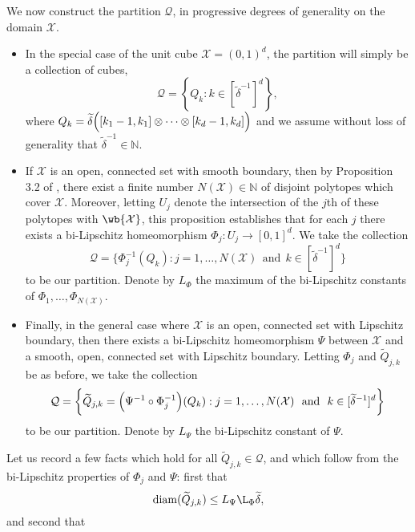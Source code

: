 \documentclass[twoside]{article}
\newcommand{\set}[1]{\left\{#1\right\}}
\newcommand{\diam}{\mathrm{diam}}
\newcommand{\1}{\mathbf{1}}
\newcommand{\Xset}{\mathcal{X}}
\newcommand{\mc}[1]{\mathcal{#1}}
\newcommand{\wt}[1]{\widetilde{#1}}
\theoremstyle{definition}
\theoremstyle{remark}
\begin{document}
We now construct the partition $\mc{Q}$, in progressive degrees of generality on the domain $\Xset.$
\begin{itemize}
	\item In the special case of the unit cube $\Xset = (0,1)^d$, the partition will simply be a collection of cubes,
	\begin{equation*}
	\mc{Q} = \set{Q_k: k \in [\wt{\delta}^{-1}]^d},
	\end{equation*}
	where $Q_k = \wt{\delta}\Bigl([k_1 - 1,k_1] \otimes \cdots \otimes [k_d - 1,k_d]\Bigr)$ and we assume without loss of generality that $\wt{\delta}^{-1} \in \mathbb{N}$.
	\item If $\mc{\Xset}$ is an open, connected set with smooth boundary, then by Proposition 3.2 of \citet{trillos2015}, there exist a finite number $N(\Xset) \in \mathbb{N}$ of disjoint polytopes which cover $\Xset$. Moreover, letting $U_j$ denote the intersection of the $j$th of these polytopes with $\wb{\Xset}$, this proposition establishes that for each $j$ there exists a bi-Lipschitz homeomorphism $\Phi_j: U_j \to [0,1]^d$. We take the collection
	\begin{equation*}
	\mc{Q} = \biggl\{\Phi_j^{-1}(Q_k): j = 1,\ldots,N(\Xset)~~\textrm{and}~~k \in [\wt{\delta}^{-1}]^d\biggr\}
	\end{equation*}
	to be our partition. Denote by $L_{\Phi}$ the maximum of the bi-Lipschitz constants of $\Phi_1,\ldots,\Phi_{N(\Xset)}$.
	\item Finally, in the general case where $\Xset$ is an open, connected set with Lipschitz boundary, then there exists a bi-Lipschitz homeomorphism $\Psi$ between $\Xset$ and a smooth, open, connected set with Lipschitz boundary. Letting $\Phi_j$ and $\wt{Q}_{j,k}$ be as before, we take the collection
	\begin{equation*}
	\mc{Q} = \biggl\{\wt{Q}_{j,k} = \Bigl(\Psi^{-1} \circ \Phi_j^{-1}\Bigr)(Q_k): j = 1,\ldots,N(\Xset)~~\textrm{and}~~k \in [\wt{\delta}^{-1}]^d\biggr\}
	\end{equation*}
	to be our partition. Denote by $L_{\Psi}$ the bi-Lipschitz constant of $\Psi$.
\end{itemize}
Let us record a few facts which hold for all $\wt{Q}_{j,k} \in \mc{Q}$, and which follow from the bi-Lipschitz properties of $\Phi_j$ and $\Psi$: first that
\begin{equation}
\label{pf:prop_optimal_transport_1}
\diam(\wt{Q}_{j,k}) \leq L_{\Psi} \L_{\Phi} \wt{\delta},
\end{equation}
and second that
\end{document}
